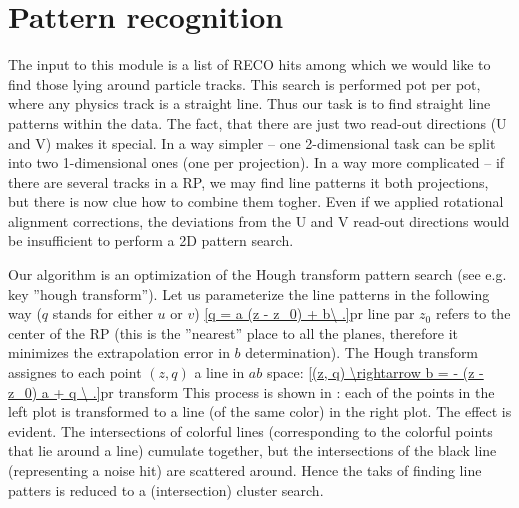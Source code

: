 

\section[pattern reco]{Pattern recognition}

The input to this module is a list of RECO hits among which we would like to find those lying around particle tracks. This search is performed pot per pot, where any physics track is a straight line. Thus our task is to find straight line patterns within the data. The fact, that there are just two read-out directions (U and V) makes it special. In a way simpler -- one 2-dimensional task can be split into two 1-dimensional ones (one per projection). In a way more complicated -- if there are several tracks in a RP, we may find line patterns it both projections, but there is now clue how to combine them togher.
Even if we applied rotational alignment corrections, the deviations from the U and V read-out directions would be insufficient to perform a 2D pattern search. 

Our algorithm is an optimization of the Hough transform pattern search (see e.g.  key ''hough transform''). Let us parameterize the line patterns in the following way ($q$ stands for either $u$ or $v$)
\eqref{q = a (z - z_0) + b\ .}{pr line par}
$z_0$ refers to the center of the RP (this is the ''nearest'' place to all the planes, therefore it minimizes the extrapolation error in $b$ determination). The Hough transform assignes to each point $(z, q)$ a line in $ab$ space:
\eqref{(z, q) \rightarrow b = - (z - z_0) a + q \ .}{pr transform}
This process is shown in : each of the points in the left plot is transformed to a line (of the same color) in the right plot. The effect is evident. The intersections of colorful lines (corresponding to the colorful points that lie around a line) cumulate together, but the intersections of the black line (representing a noise hit) are scattered around. Hence the taks of finding line patters is reduced to a (intersection) cluster search.


